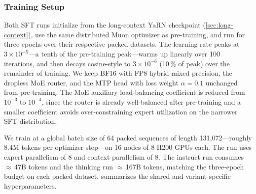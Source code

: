 \documentclass{llmxive}
\begin{document}
\subsubsection{Training Setup}
\label{sec:sft-training}

Both SFT runs initialize from the long-context YaRN checkpoint
(\cref{sec:long-context}), use the same distributed Muon optimizer as
pre-training, and run for three epochs over their respective packed
datasets. The learning rate peaks at $3{\times}10^{-5}$---a tenth of the
pre-training peak---warms up linearly over 100 iterations, and then
decays cosine-style to $3{\times}10^{-6}$ (10\,\% of peak) over the
remainder of training. We keep BF16 with FP8 hybrid mixed precision, the dropless MoE
router, and the MTP head with loss weight $\alpha = 0.1$ unchanged from
pre-training. The MoE auxiliary load-balancing coefficient is reduced from
$10^{-3}$ to $10^{-4}$, since the router is already well-balanced after
pre-training and a smaller coefficient avoids over-constraining expert
utilization on the narrower SFT distribution.

We train at a global batch size of 64 packed sequences of length
131{,}072—roughly 8.4M tokens per optimizer step—on 16 nodes of 8
H200 GPUs each. The run uses expert parallelism of 8 and context
parallelism of 8. The instruct run consumes $\approx$\,47B tokens and the
thinking run $\approx$\,167B tokens, matching the three-epoch budget on
each packed dataset.  summarizes the shared and
variant-specific hyperparameters.
\end{document}
